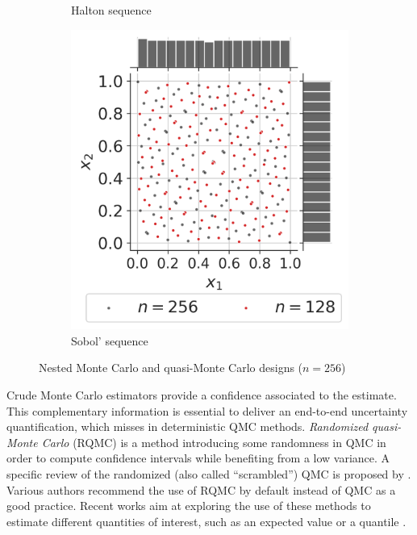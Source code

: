 \begin{figure}[ht]
\begin{subfigure}[b]{0.32\textwidth}
        \caption{Halton sequence}
    \end{subfigure}
    \hfill
    \begin{subfigure}[b]{0.32\textwidth}
        \centering
        \includegraphics[width=\textwidth]{../numerical_experiments/chapter1/figures/quasi_MonteCarlo_256.png}
        \caption{Sobol' sequence}
    \end{subfigure}
       \caption{Nested Monte Carlo and quasi-Monte Carlo designs ($n=256$)}
       \label{fig:quasi_monte_carlo_designs}
\end{figure}

Crude Monte Carlo estimators provide a confidence associated to the estimate. 
This complementary information is essential to deliver an end-to-end uncertainty quantification, which misses in deterministic QMC methods.  
\textit{Randomized quasi-Monte Carlo} (RQMC) is a method introducing some randomness in QMC in order to compute confidence intervals while benefiting from a low variance. 
A specific review of the randomized (also called ``scrambled'') QMC is proposed by \citet{lecuyer_2018}. 
Various authors recommend the use of RQMC by default instead of QMC as a good practice. 
Recent works aim at exploring the use of these methods to estimate different quantities of interest, such as an expected value \citep{gobet_2022} or a quantile \citep{tuffin_2019}. 

